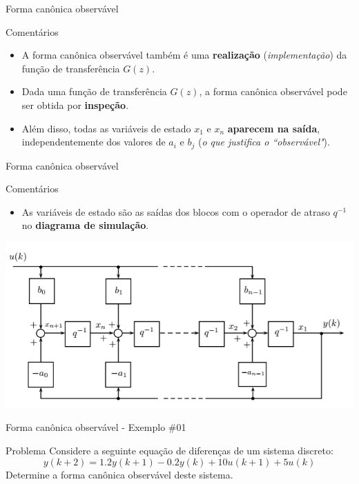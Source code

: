 \begin{frame}{Forma canônica observável}
\begin{block}{Comentários}
\begin{itemize}
    \item A forma canônica observável também é uma \textbf{realização} (\textit{implementação}) da função de transferência $G(z)$.
    \item Dada uma função de transferência $G(z)$, a forma canônica observável pode ser obtida por \textbf{inspeção}.
    \item Além disso, todas as variáveis de estado $x_1$ e $x_n$ \textbf{aparecem na saída}, independentemente dos valores de $a_i$ e $b_j$ (\textit{o que justifica o ``observável"}).
\end{itemize}
\end{block}
\end{frame}

\begin{frame}{Forma canônica observável}
\begin{block}{Comentários}
\begin{itemize}
    \item As variáveis de estado são as saídas dos blocos com o operador de atraso $q^{-1}$ no \textbf{diagrama de simulação}. 
\end{itemize}
\end{block}
\centerline{\includegraphics[width=0.8\linewidth]{Figuras/Ch14/fig7.PNG}}
\end{frame}

\begin{frame}{Forma canônica observável - Exemplo \#01}
\begin{block}{Problema}
Considere a seguinte equação de diferenças de um sistema discreto:
$$y(k+2) = \num{1,2}y(k+1) - \num{0,2}y(k) + 10u(k+1)+5u(k)$$
Determine a forma canônica observável deste sistema.
\end{block}
\end{frame}

